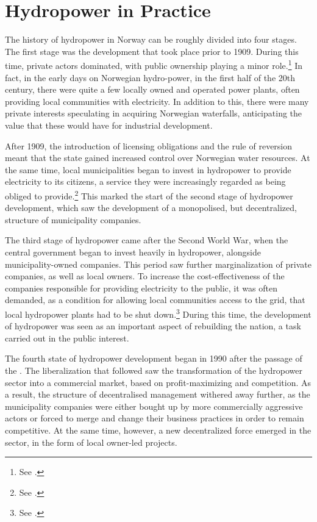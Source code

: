 \section{Hydropower in Practice}

The history of hydropower in Norway can be roughly divided into four stages. The first stage was the development that took place prior to 1909. During this time, private actors dominated, with public ownership playing a minor role.\footnote{See \cite{otprp61}.} In fact, in the early days on Norwegian hydro-power, in the first half of the 20th century, there were quite a few locally owned and operated power plants, often providing local communities with electricity. In addition to this, there were many private interests speculating in acquiring Norwegian waterfalls, anticipating the value that these would have for industrial development. 

After 1909, the introduction of licensing obligations and the rule of reversion meant that the state gained increased control over Norwegian water resources. At the same time, local municipalities began to invest in hydropower to provide electricity to its citizens, a service they were increasingly regarded as being obliged to provide.\footnote{See \cite{otprp61}.} This marked the start of the second stage of hydropower development, which saw the development of a monopolised, but decentralized, structure of municipality companies.

The third stage of hydropower came after the Second World War, when the central government began to invest heavily in hydropower, alongside municipality-owned companies. This period saw further marginalization of private companies, as well as local owners. To increase the cost-effectiveness of the companies responsible for providing electricity to the public, it was often demanded, as a condition for allowing local communities access to the grid, that local hydropower plants had to be shut down.\footnote{See \cite[p.111]{hindrum94}.} During this time, the development of hydropower was seen as an important aspect of rebuilding the nation, a task carried out in the public interest.

The fourth state of hydropower development began in 1990 after the passage of the \cite{ea90}. The liberalization that followed saw the transformation of the hydropower sector into a commercial market, based on profit-maximizing and competition. As a result, the structure of decentralised management withered away further, as the municipality companies were either bought up by more commercially aggressive actors or forced to merge and change their business practices in order to remain competitive. At the same time, however, a new decentralized force emerged in the sector, in the form of local owner-led projects. 

